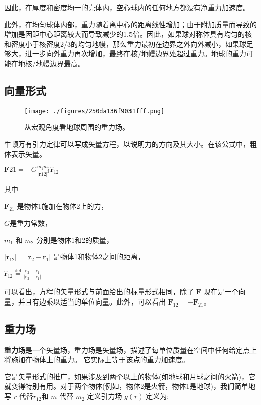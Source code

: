 因此，在厚度和密度均一的壳体内，空心球内的任何地方都没有净重力加速度。

此外，在均匀球体内部，重力随着离中心的距离线性增加；由于附加质量而导致的增加是因距中心距离较大而导致减少的1.5倍。因此，如果球对称体具有均匀的核和密度小于核密度2/3的均匀地幔，那么重力最初在边界之外向外减小，如果球足够大，进一步向外重力再次增加，最终在核/地幔边界处超过重力。地球的重力可能在地核/地幔边界最高。

\subsection{向量形式}

\begin{figure}[ht]
\centering
\texttt{[image: ./figures/250da136f9031fff.png]}
\caption{从宏观角度看地球周围的重力场。} \label{fig_UG_6}
\end{figure}

牛顿万有引力定律可以写成矢量方程，以说明力的方向及其大小。在该公式中，粗体表示矢量。

$\mathbf{F}{21} = -G \frac{m_1 m_2}{|\mathbf{r}{12}|^2} \hat{\mathbf{r}}_{12}$

其中

$\mathbf{F}_{21}$ 是物体1施加在物体2上的力，

$G$是重力常数，

$m_1$ 和 $m_2$ 分别是物体1和2的质量，

$|\mathbf{r}_{12}| = |\mathbf{r}_2 - \mathbf{r}_1|$ 是物体1和物体2之间的距离，

$\hat{\mathbf{r}}_{12} \stackrel{\text{def}}{=} \frac{\mathbf{r}_2 - \mathbf{r}_1}{|\mathbf{r}_2 - \mathbf{r}_1|}$ \quad {}


可以看出，方程的矢量形式与前面给出的标量形式相同，除了 $\mathbf{F}$ 现在是一个向量，并且有边乘以适当的单位向量。此外，可以看出 $\mathbf{F}_{12} = -\mathbf{F}_{21}$。

\subsection{重力场}

\textbf{重力场}是一个矢量场，重力场是矢量场，描述了每单位质量在空间中任何给定点上将施加在物体上的重力。 它实际上等于该点的重力加速度。

它是矢量形式的推广，如果涉及到两个以上的物体(如地球和月球之间的火箭)，它就变得特别有用。对于两个物体(例如，物体2是火箭，物体1是地球)，我们简单地写 $r$ 代替$r_{12}$和 $m$ 代替 $m_2$ 定义引力场 $g(r)$ 定义为:


